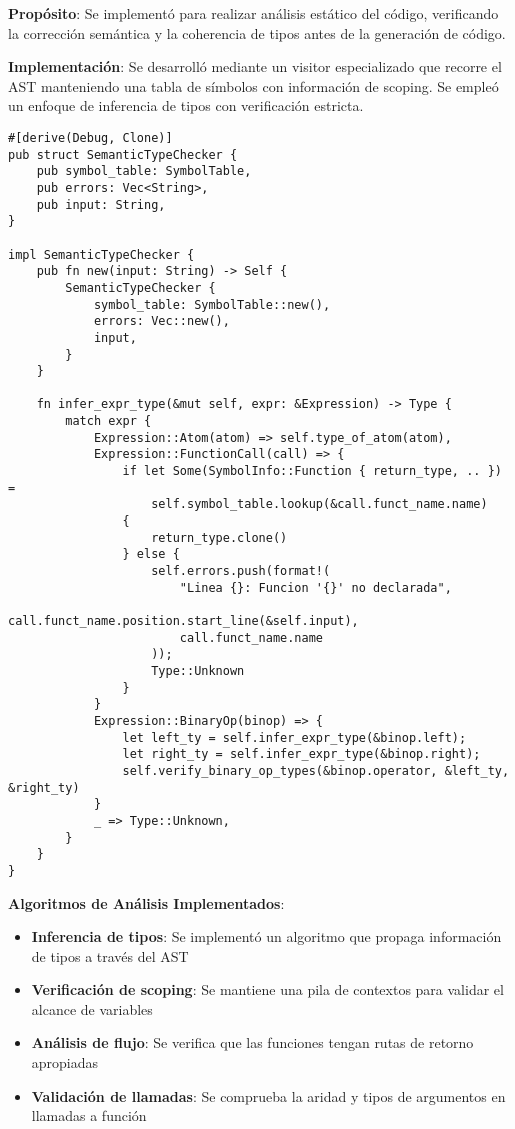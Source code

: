 \documentclass[12pt,a4paper]{article}
\begin{document}
\textbf{Propósito}: Se implementó para realizar análisis estático del código, verificando la corrección semántica y la coherencia de tipos antes de la generación de código.

\textbf{Implementación}: Se desarrolló mediante un visitor especializado que recorre el AST manteniendo una tabla de símbolos con información de scoping. Se empleó un enfoque de inferencia de tipos con verificación estricta.

\begin{lstlisting}[style=rustcode,caption=Verificador semántico principal]
#[derive(Debug, Clone)]
pub struct SemanticTypeChecker {
    pub symbol_table: SymbolTable,
    pub errors: Vec<String>,
    pub input: String,
}

impl SemanticTypeChecker {
    pub fn new(input: String) -> Self {
        SemanticTypeChecker {
            symbol_table: SymbolTable::new(),
            errors: Vec::new(),
            input,
        }
    }

    fn infer_expr_type(&mut self, expr: &Expression) -> Type {
        match expr {
            Expression::Atom(atom) => self.type_of_atom(atom),
            Expression::FunctionCall(call) => {
                if let Some(SymbolInfo::Function { return_type, .. }) =
                    self.symbol_table.lookup(&call.funct_name.name)
                {
                    return_type.clone()
                } else {
                    self.errors.push(format!(
                        "Linea {}: Funcion '{}' no declarada", 
                        call.funct_name.position.start_line(&self.input), 
                        call.funct_name.name
                    ));
                    Type::Unknown
                }
            }
            Expression::BinaryOp(binop) => {
                let left_ty = self.infer_expr_type(&binop.left);
                let right_ty = self.infer_expr_type(&binop.right);
                self.verify_binary_op_types(&binop.operator, &left_ty, &right_ty)
            }
            _ => Type::Unknown,
        }
    }
}
\end{lstlisting}

\textbf{Algoritmos de Análisis Implementados}:
\begin{itemize}
    \item \textbf{Inferencia de tipos}: Se implementó un algoritmo que propaga información de tipos a través del AST
    \item \textbf{Verificación de scoping}: Se mantiene una pila de contextos para validar el alcance de variables
    \item \textbf{Análisis de flujo}: Se verifica que las funciones tengan rutas de retorno apropiadas
    \item \textbf{Validación de llamadas}: Se comprueba la aridad y tipos de argumentos en llamadas a función
\end{itemize}
\end{document}
